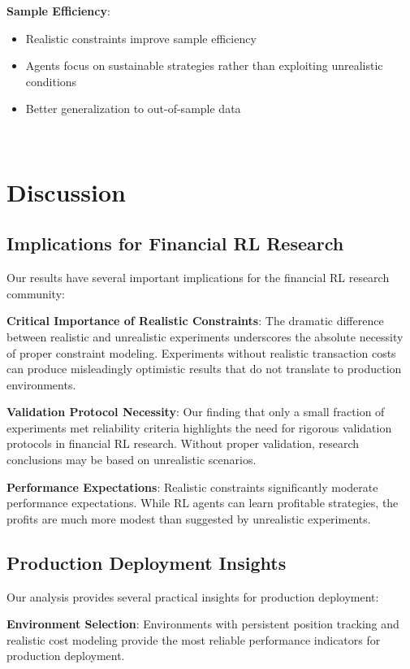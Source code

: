 \documentclass[11pt,a4paper]{article}
\begin{document}
\textbf{Sample Efficiency}:
\begin{itemize}
\item Realistic constraints improve sample efficiency
\item Agents focus on sustainable strategies rather than exploiting unrealistic conditions
\item Better generalization to out-of-sample data
\end{itemize}
\
\

\section{Discussion}
\label{sec:discussion}

\subsection{Implications for Financial RL Research}

Our results have several important implications for the financial RL research community:

\textbf{Critical Importance of Realistic Constraints}: The dramatic difference between realistic and unrealistic experiments underscores the absolute necessity of proper constraint modeling. Experiments without realistic transaction costs can produce misleadingly optimistic results that do not translate to production environments.

\textbf{Validation Protocol Necessity}: Our finding that only a small fraction of experiments met reliability criteria highlights the need for rigorous validation protocols in financial RL research. Without proper validation, research conclusions may be based on unrealistic scenarios.

\textbf{Performance Expectations}: Realistic constraints significantly moderate performance expectations. While RL agents can learn profitable strategies, the profits are much more modest than suggested by unrealistic experiments.

\subsection{Production Deployment Insights}

Our analysis provides several practical insights for production deployment:

\textbf{Environment Selection}: Environments with persistent position tracking and realistic cost modeling provide the most reliable performance indicators for production deployment.
\end{document}
